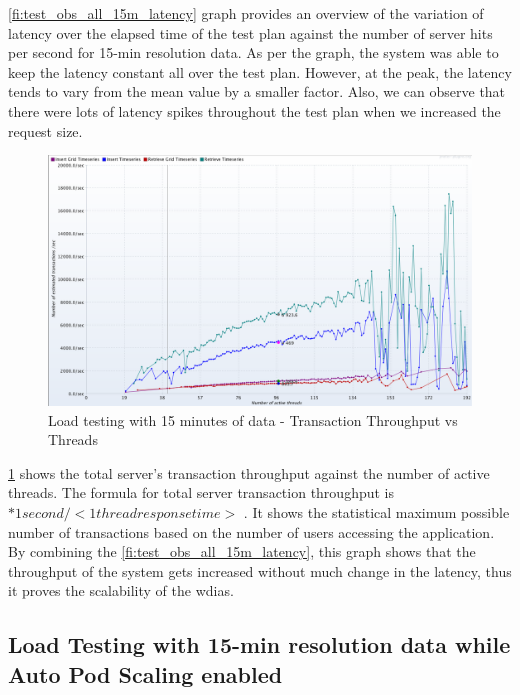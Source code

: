 \cref{fi:test_obs_all_15m_latency} graph provides an overview of the variation of latency over the elapsed time of the test plan against the number of server hits per second for 15-min resolution data. As per the graph, the system was able to keep the latency constant all over the test plan. However, at the peak, the latency tends to vary from the mean value by a smaller factor. Also, we can observe that there were lots of latency spikes throughout the test plan when we increased the request size.

\begin{figure}[htp]
    \centering
    \includegraphics[width=1.0\textwidth]{results/obs/all/obs_all_15m_transaction_throughtput_vs_threads.png}
    \caption{Load testing with 15 minutes of data - Transaction Throughput vs Threads}
    \label{fi:test_obs_all_15m_throughtput}
\end{figure}

\cref{fi:test_obs_all_15m_throughtput} shows the total server's transaction throughput against the number of active threads.
The formula for total server transaction throughput is \(<active threads> * 1 second / <1  thread response time>\) \cite{JMeterPluginsTransactionPlugin}. It shows the statistical maximum possible number of transactions based on the number of users accessing the application.
By combining the \cref{fi:test_obs_all_15m_latency}, this graph shows that the throughput of the system gets increased without much change in the latency, thus it proves the scalability of the \acrshort{wdias}.


\subsection{Load Testing with 15-min resolution data while Auto Pod Scaling enabled}
\label{subse:obs_test_plan_all_auto_15min}

